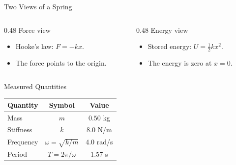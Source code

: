 \documentclass{beamer}
\begin{document}
\begin{frame}{Two Views of a Spring}
  \begin{columns}[T]
    \begin{column}{0.48\textwidth}
      Force view
      \begin{itemize}
        \item Hooke's law: $F = -k x$.
        \item The force points to the origin.
      \end{itemize}
    \end{column}
    \begin{column}{0.48\textwidth}
      Energy view
      \begin{itemize}
        \item Stored energy: $U = \tfrac{1}{2} k x^2$.
        \item The energy is zero at $x = 0$.
      \end{itemize}
    \end{column}
  \end{columns}
\end{frame}

\begin{frame}{Measured Quantities}
  \centering
  \begin{tabular}{lcc}
    Quantity & Symbol & Value \\
    \hline
    Mass & $m$ & $0.50$ kg \\
    Stiffness & $k$ & $8.0$ N/m \\
    Frequency & $\omega = \sqrt{k/m}$ & $4.0$ rad/s \\
    Period & $T = 2\pi/\omega$ & $1.57$ s \\
  \end{tabular}
\end{frame}
\end{document}
